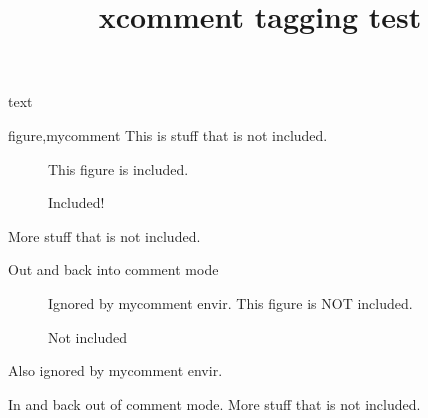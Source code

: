 \documentclass{article}
\title{xcomment tagging test}
\begin{document}
text

\begin{xcomment}{figure,mycomment}
This is stuff that is not included.
\begin{figure}
This figure is included.
\caption{Included!}
\end{figure}
More stuff that is not included.
\begin{mycomment}
Out and back into comment mode
\begin{figure}
Ignored by mycomment envir.
This figure is NOT included.
\caption{Not included}
\end{figure}
Also ignored by mycomment envir.
\end{mycomment}
In and back out of comment mode.
More stuff that is not included.
\end{xcomment}
\end{document}
